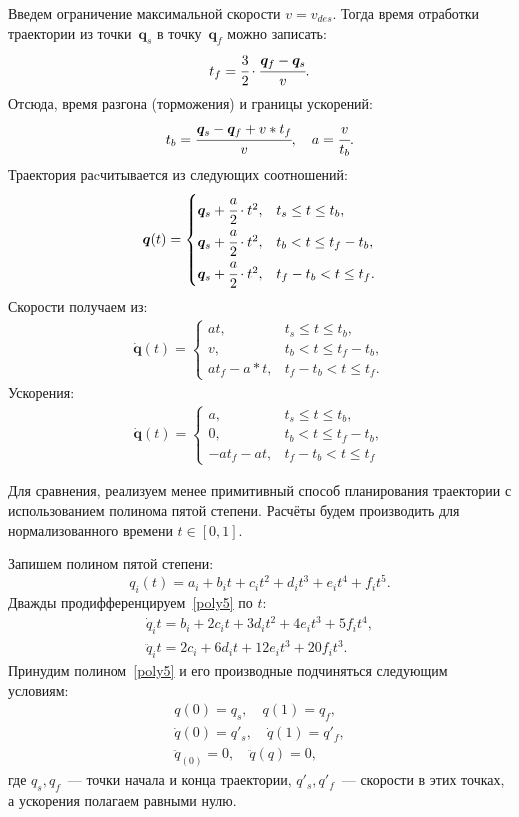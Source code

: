 Введем ограничение максимальной скорости $ v = v_{des} $.
Тогда время отработки траектории из точки~$ \bm{q}_s $ в точку~$ \bm{q}_f $ можно записать:
\begin{equation}
	t_f = \cfrac{3}{2} \cdot \cfrac{\bm{q}_f - \bm{q}_s}{v}.
\end{equation}
Отсюда, время разгона (торможения) и границы ускорений:
\begin{equation}
	t_b = \cfrac{\bm{q}_s - \bm{q}_f + v * t_f}{v}, \quad a = \cfrac{v}{t_b}.
\end{equation}
Траектория раcчитывается из следующих соотношений:
\begin{align}
	\bm{q}(t) = 
	\begin{cases}
		\bm{q}_s + \cfrac{a}{2} \cdot t^2, &t_s \le t \le t_b, \\
		\bm{q}_s + \cfrac{a}{2} \cdot t^2, &t_b < t \le t_f - t_b,\\
		\bm{q}_s + \cfrac{a}{2} \cdot t^2, &t_f - t_b < t \le t_f.
	\end{cases}
\end{align}
Скорости получаем из:
\begin{align}
	\dot{\bm{q}}(t) = 
	\begin{cases}
		a  t, &t_s \le t \le t_b, \\
		v, &t_b < t \le t_f - t_b,\\
		a  t_f - a * t, &t_f - t_b < t \le t_f.
	\end{cases}
\end{align}
Ускорения:
\begin{align}
	\dot{\bm{q}}(t) = 
	\begin{cases}
		a, &t_s \le t \le t_b, \\
		0, &t_b < t \le t_f - t_b,\\
		-a  t_f - a  t, &t_f - t_b < t \le t_f
	\end{cases}
\end{align}

Для сравнения, реализуем менее примитивный способ планирования траектории с использованием полинома пятой степени. Расчёты будем производить для нормализованного времени $ t \in [0, 1] $.

Запишем полином пятой степени:
\begin{equation}\label{poly5}
	q_i(t) = a_i + b_i t + c_i t^2 + d_i t^3 + e_i t^4 + f_i t^5.
\end{equation}
Дважды продифференцируем~\eqref{poly5} по $ t $:
\begin{gather}
	\dot{q}_i{t} = b_i + 2c_i t + 3 d_i t^2 + 4 e_i t^3 + 5 f_i t^4, \\
	\ddot{q}_i{t} = 2c_i  + 6 d_i t + 12 e_i t^3 + 20 f_i t^3.
\end{gather}
Принудим полином~\eqref{poly5} и его производные подчиняться следующим условиям:
\begin{gather}\label{con1}
	q(0) = q_s, \quad q(1) = q_f, \\
	\dot{q}(0) = q'_s, \quad \dot{q}(1) = q'_f, \\
	\label{con3}
	\ddot{q}_(0) = 0, \quad \ddot{q}(q) = 0,
\end{gather}
где $ q_s, q_f $~--- точки начала и конца траектории, $ q'_s, q'_f $~--- скорости в этих точках, а ускорения полагаем равными нулю. 


